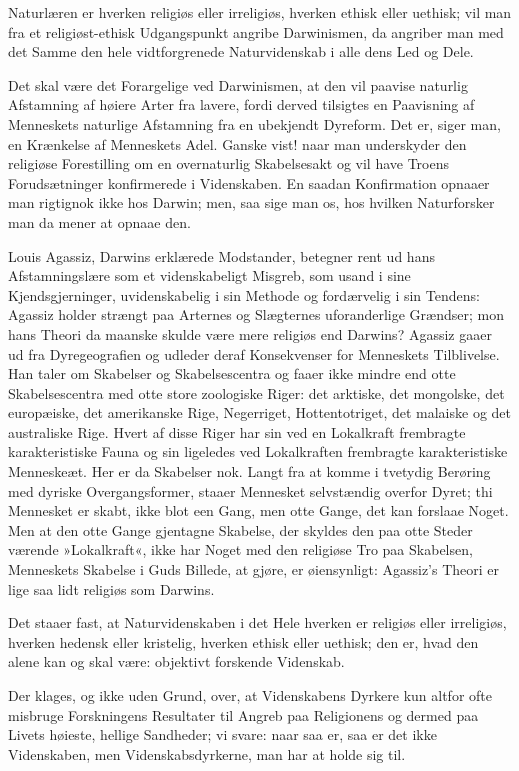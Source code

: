 \documentclass[12pt,a4paper]{article}
\begin{document}
Naturlæren er hverken religiøs eller irreligiøs, hverken ethisk eller
uethisk; vil man fra et religiøst-ethisk Udgangspunkt angribe
Darwinismen, da angriber man med det Samme den hele vidtforgrenede
Naturvidenskab i alle dens Led og Dele.

Det skal være det Forargelige ved Darwinismen, at den vil paavise
naturlig Afstamning af høiere Arter fra lavere, fordi derved tilsigtes
en Paavisning af Menneskets naturlige Afstamning fra en ubekjendt
Dyreform. Det er, siger man, en Krænkelse af Menneskets Adel. Ganske
vist! naar man underskyder den religiøse Forestilling om en
overnaturlig Skabelsesakt og vil have Troens Forudsætninger
konfirmerede i Videnskaben. En saadan Konfirmation opnaaer man
rigtignok ikke hos Darwin; men, saa sige man os, hos hvilken
Naturforsker man da mener at opnaae den.

Louis Agassiz, Darwins erklærede Modstander, betegner rent ud hans
Afstamningslære som et videnskabeligt Misgreb, som usand i sine
Kjendsgjerninger, uvidenskabelig i sin Methode og fordærvelig i sin
Tendens: Agassiz holder strængt paa Arternes og Slægternes uforanderlige
Grændser; mon hans Theori da maanske skulde være mere religiøs end
Darwins? Agassiz gaaer ud fra Dyregeografien og udleder deraf
Konsekvenser for Menneskets Tilblivelse. Han taler om Skabelser og
Skabelsescentra og faaer ikke mindre end otte Skabelsescentra med otte
store zoologiske Riger: det arktiske, det mongolske, det europæiske,
det amerikanske Rige, Negerriget, Hottentotriget, det malaiske og det
australiske Rige. Hvert af disse Riger har sin ved en Lokalkraft
frembragte karakteristiske Fauna og sin ligeledes ved Lokalkraften
frembragte karakteristiske Menneskeæt. Her er da Skabelser nok. Langt
fra at komme i tvetydig Berøring med dyriske Overgangsformer, staaer
Mennesket selvstændig overfor Dyret; thi Mennesket er skabt, ikke blot
een Gang, men otte Gange, det kan forslaae Noget. Men at den otte Gange
gjentagne Skabelse, der skyldes den paa otte Steder værende »Lokalkraft«,
ikke har Noget med den religiøse Tro paa Skabelsen, Menneskets Skabelse
i Guds Billede, at gjøre, er øiensynligt: Agassiz's Theori er lige saa
lidt religiøs som Darwins.


Det staaer fast, at Naturvidenskaben i det Hele hverken er religiøs
eller irreligiøs, hverken hedensk eller kristelig, hverken ethisk eller
uethisk; den er, hvad den alene kan og skal være: objektivt forskende
Videnskab.

Der klages, og ikke uden Grund, over, at Videnskabens Dyrkere kun
altfor ofte misbruge Forskningens Resultater til Angreb paa Religionens
og dermed paa Livets høieste, hellige Sandheder; vi svare: naar saa
er, saa er det ikke Videnskaben, men Videnskabsdyrkerne, man har at
holde sig til.
\end{document}
